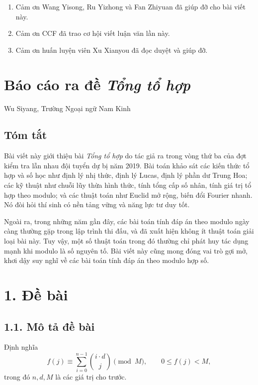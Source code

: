 \documentclass[11pt]{article}
\begin{document}
\begin{enumerate}
  \item Cảm ơn Wang Yisong, Ru Yizhong và Fan Zhiyuan đã giúp đỡ cho bài viết
        này.
  \item Cảm ơn CCF đã trao cơ hội viết luận văn lần này.
  \item Cảm ơn huấn luyện viên Xu Xianyou đã đọc duyệt và giúp đỡ.
\end{enumerate}

\section*{Báo cáo ra đề \emph{Tổng tổ hợp}}

\begin{center}
Wu Siyang, Trường Ngoại ngữ Nam Kinh
\end{center}

\subsection*{Tóm tắt}

Bài viết này giới thiệu bài \emph{Tổng tổ hợp} do tác giả ra trong vòng thứ ba
của đợt kiểm tra lẫn nhau đội tuyển dự bị năm 2019. Bài toán khảo sát các
kiến thức tổ hợp và số học như định lý nhị thức, định lý Lucas, định lý phần
dư Trung Hoa; các kỹ thuật như chuỗi lũy thừa hình thức, tính tổng cấp số
nhân, tính giá trị tổ hợp theo modulo; và các thuật toán như Euclid mở rộng,
biến đổi Fourier nhanh. Nó đòi hỏi thí sinh có nền tảng vững và năng lực tư
duy tốt.

Ngoài ra, trong những năm gần đây, các bài toán tính đáp án theo modulo ngày
càng thường gặp trong lập trình thi đấu, và đã xuất hiện không ít thuật toán
giải loại bài này. Tuy vậy, một số thuật toán trong đó thường chỉ phát huy tác
dụng mạnh khi modulo là số nguyên tố. Bài viết này cũng mong đóng vai trò gợi
mở, khơi dậy suy nghĩ về các bài toán tính đáp án theo modulo hợp số.

\section*{1. Đề bài}

\subsection*{1.1. Mô tả đề bài}

Định nghĩa
\[
  f(j)\equiv \sum_{i=0}^{n-1}\binom{i\cdot d}{j}\pmod M,\qquad
  0\le f(j)<M,
\]
trong đó \(n,d,M\) là các giá trị cho trước.
\end{document}
